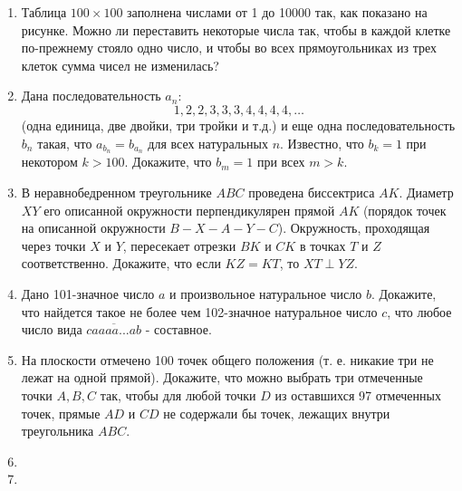 \documentclass{article}
\begin{document}
\begin{enumerate}[label*=\textbf{\arabic{enumi}.}]
	\setcounter{enumi}{0}
	\item Таблица $100 \times 100$ заполнена числами от 1 до 10000 так, как показано на рисунке. Можно ли переставить некоторые числа так, чтобы в каждой клетке по-прежнему стояло одно число, и чтобы во всех прямоугольниках из трех клеток сумма чисел не изменилась?
	
	\item Дана последовательность $a_n$:
	$$1, 2, 2, 3, 3, 3, 4, 4, 4, 4, \dotsc$$
	(одна единица, две двойки, три тройки и т.д.) и еще одна последовательность $b_n$ такая, что $a_{b_n} 
	= b_{a_n}$ для всех натуральных $n$. Известно, что $b_k = 1$ при некотором $k > 100$. Докажите, что $b_m = 1$ при всех $m > k$.
	
	\item В неравнобедренном треугольнике $ABC$ проведена биссектриса $AK$. Диаметр $XY$ его описанной окружности перпендикулярен прямой $AK$ (порядок точек на описанной окружности $B-X-A-Y-C$). Окружность, проходящая через точки $X$ и $Y$, пересекает отрезки $BK$ и $CK$ в точках $T$ и $Z$ соответственно. Докажите, что если $KZ = KT$, то $XT \perp YZ$.
	
	\item Дано 101-значное число $a$ и произвольное натуральное число $b$. Докажите, что найдется такое не более чем 102-значное натуральное число $c$, что любое число вида $\overline{caaaa...ab}$ - составное.
	
	\item На плоскости отмечено 100 точек общего положения (т. е. никакие три не лежат на одной прямой). Докажите, что можно выбрать три отмеченные точки $A, B, C$ так, чтобы для любой точки $D$ из оставшихся 97 отмеченных точек, прямые $AD$ и $CD$ не содержали бы точек, лежащих внутри треугольника $ABC$.
	
	\item 
	
	\item 
	
\end{enumerate}
\end{document}
